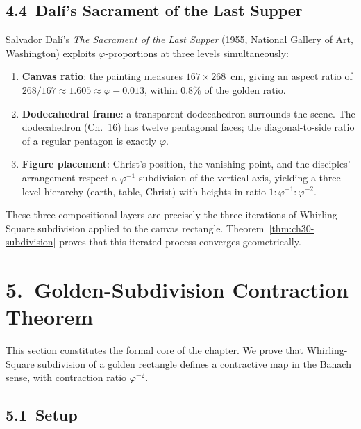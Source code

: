 \subsection{4.4\ Dal\'{i}'s Sacrament of the
  Last Supper}\label{subsec:ch30-dali}

Salvador Dal\'{i}'s \emph{The Sacrament of the
Last Supper} (1955, National Gallery of Art,
Washington) exploits $\varphi$-proportions at
three levels simultaneously:

\begin{enumerate}
  \item \textbf{Canvas ratio}: the painting
    measures $167 \times 268$~cm, giving an
    aspect ratio of $268 / 167 \approx 1.605
    \approx \varphi - 0.013$, within $0.8\%$ of
    the golden ratio.

  \item \textbf{Dodecahedral frame}: a transparent
    dodecahedron surrounds the scene.  The
    dodecahedron (Ch.~16) has twelve pentagonal
    faces; the diagonal-to-side ratio of a regular
    pentagon is exactly $\varphi$.

  \item \textbf{Figure placement}: Christ's
    position, the vanishing point, and the
    disciples' arrangement respect a
    $\varphi^{-1}$ subdivision of the vertical
    axis, yielding a three-level hierarchy
    (earth, table, Christ) with heights in ratio
    $1 : \varphi^{-1} : \varphi^{-2}$.
\end{enumerate}

These three compositional layers are precisely
the three iterations of Whirling-Square
subdivision applied to the canvas rectangle.
Theorem~\ref{thm:ch30-subdivision} proves that
this iterated process converges geometrically.

\section{5.\ Golden-Subdivision Contraction
  Theorem}\label{sec:ch30-subdivision-thm}

This section constitutes the formal core of the
chapter.  We prove that Whirling-Square
subdivision of a golden rectangle defines a
contractive map in the Banach sense, with
contraction ratio $\varphi^{-2}$.

\subsection{5.1\ Setup}\label{subsec:ch30-setup}

